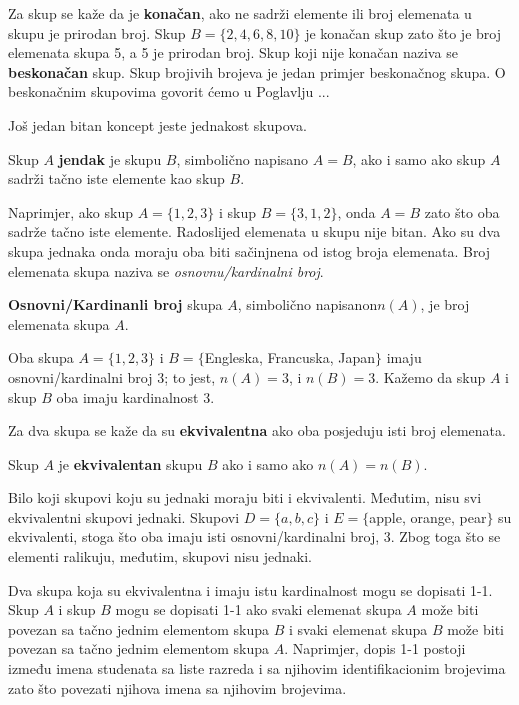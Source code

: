 \documentclass[a4paper,14pt,svgnames]{article}
\begin{document}
Za skup se kaže da je \textbf{konačan}, ako ne sadrži elemente ili broj elemenata u skupu je prirodan broj. Skup $B=\{2, 4, 6, 8, 10\}$ je konačan skup zato što je broj elemenata skupa 5, a 5 je prirodan broj. Skup koji nije konačan naziva se \textbf{beskonačan} skup. Skup brojivih brojeva je jedan primjer beskonačnog skupa. O beskonačnim skupovima govorit ćemo u Poglavlju ...\par\smallskip
Još jedan bitan koncept jeste jednakost skupova.\smallskip
\begin{tcolorbox}
Skup $A$ \textbf{jendak} je skupu $B$, simbolično napisano $A=B$, ako i samo ako skup $A$ sadrži tačno iste elemente kao skup $B$.
\end{tcolorbox}\smallskip
\noindent Naprimjer, ako skup $A=\{1, 2, 3\}$ i skup $B=\{3, 1, 2\}$, onda $A=B$ zato što oba sadrže tačno iste elemente. Radoslijed elemenata u skupu nije bitan. Ako su dva skupa jednaka onda moraju oba biti sačinjnena od istog broja elemenata. Broj elemenata skupa naziva se \textit{osnovnu/kardinalni broj}.\smallskip
\begin{tcolorbox}
\textbf{Osnovni/Kardinanli broj} skupa $A$, simbolično napisanon$n(A)$, je broj elemenata skupa $A$.
\end{tcolorbox}\smallskip
Oba skupa $A=\{1, 2, 3\}$ i $B=\{$Engleska, Francuska, Japan$\}$ imaju osnovni/kardinalni broj 3; to jest, $n(A)=3$, i $n(B)=3$. Kažemo da skup $A$ i skup $B$ oba imaju kardinalnost 3.\par
Za dva skupa se kaže da su \textbf{ekvivalentna} ako oba posjeduju isti broj elemenata.\smallskip
\begin{tcolorbox}
Skup $A$ je \textbf{ekvivalentan} skupu $B$ ako i samo ako $n(A)=n(B)$.
\end{tcolorbox}\smallskip
\noindent Bilo koji skupovi koju su jednaki moraju biti i ekvivalenti. Međutim, nisu svi ekvivalentni skupovi jednaki. Skupovi $D=\{a, b, c\}$ i $E=\{$apple, orange, pear$\}$ su ekvivalenti, stoga što oba imaju isti osnovni/kardinalni broj, 3. Zbog toga što se elementi ralikuju, međutim, skupovi nisu jednaki.\par
Dva skupa koja su ekvivalentna i  imaju istu kardinalnost mogu se dopisati 1-1. Skup $A$ i skup $B$ mogu se dopisati 1-1 ako svaki elemenat skupa $A$ može biti povezan sa tačno jednim elementom skupa $B$ i svaki elemenat skupa $B$ može biti povezan sa tačno jednim elementom skupa $A$. Naprimjer, dopis 1-1 postoji između imena studenata sa liste razreda i sa njihovim identifikacionim brojevima zato što povezati njihova imena sa njihovim brojevima.\smallskip
\end{document}
